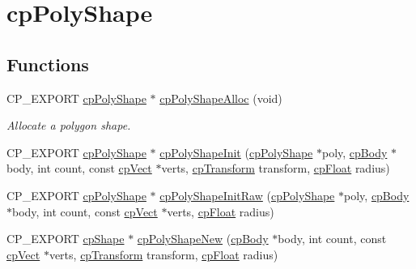 \hypertarget{group__cp_poly_shape}{}\section{cp\+Poly\+Shape}
\label{group__cp_poly_shape}
\subsection*{Functions}
\begin{DoxyCompactItemize}
\item 
\mbox{\label{group__cp_poly_shape_gaf21feac0067c6641e9999cf53fa5a507}} 
C\+P\+\_\+\+E\+X\+P\+O\+RT \mbox{\hyperlink{structcp_poly_shape}{cp\+Poly\+Shape}} $\ast$ \mbox{\hyperlink{group__cp_poly_shape_gaf21feac0067c6641e9999cf53fa5a507}{cp\+Poly\+Shape\+Alloc}} (void)
\begin{DoxyCompactList}\small\item\em Allocate a polygon shape. \end{DoxyCompactList}\item 
C\+P\+\_\+\+E\+X\+P\+O\+RT \mbox{\hyperlink{structcp_poly_shape}{cp\+Poly\+Shape}} $\ast$ \mbox{\hyperlink{group__cp_poly_shape_gac95c2ffa0beb4d7d328612e8f6198745}{cp\+Poly\+Shape\+Init}} (\mbox{\hyperlink{structcp_poly_shape}{cp\+Poly\+Shape}} $\ast$poly, \mbox{\hyperlink{structcp_body}{cp\+Body}} $\ast$body, int count, const \mbox{\hyperlink{structcp_vect}{cp\+Vect}} $\ast$verts, \mbox{\hyperlink{structcp_transform}{cp\+Transform}} transform, \mbox{\hyperlink{group__basic_types_gac1ed65573e035bf892505768c852d8d3}{cp\+Float}} radius)
\item 
C\+P\+\_\+\+E\+X\+P\+O\+RT \mbox{\hyperlink{structcp_poly_shape}{cp\+Poly\+Shape}} $\ast$ \mbox{\hyperlink{group__cp_poly_shape_gab38d2c0190ee256f8723adde83c8ccb6}{cp\+Poly\+Shape\+Init\+Raw}} (\mbox{\hyperlink{structcp_poly_shape}{cp\+Poly\+Shape}} $\ast$poly, \mbox{\hyperlink{structcp_body}{cp\+Body}} $\ast$body, int count, const \mbox{\hyperlink{structcp_vect}{cp\+Vect}} $\ast$verts, \mbox{\hyperlink{group__basic_types_gac1ed65573e035bf892505768c852d8d3}{cp\+Float}} radius)
\item 
C\+P\+\_\+\+E\+X\+P\+O\+RT \mbox{\hyperlink{structcp_shape}{cp\+Shape}} $\ast$ \mbox{\hyperlink{group__cp_poly_shape_ga4c25992d3d90362168b2681acd7d7d62}{cp\+Poly\+Shape\+New}} (\mbox{\hyperlink{structcp_body}{cp\+Body}} $\ast$body, int count, const \mbox{\hyperlink{structcp_vect}{cp\+Vect}} $\ast$verts, \mbox{\hyperlink{structcp_transform}{cp\+Transform}} transform, \mbox{\hyperlink{group__basic_types_gac1ed65573e035bf892505768c852d8d3}{cp\+Float}} radius)

\end{DoxyCompactItemize}

